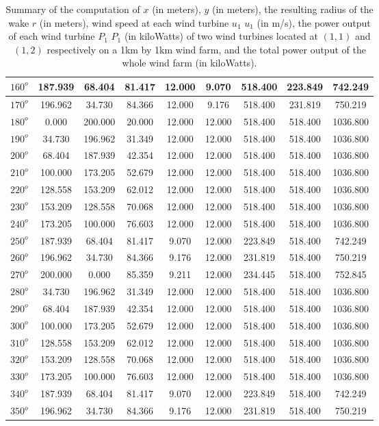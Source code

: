 \begin{table}[H]
\begin{tabular}{|c|c|c|c|c|c|c|c|c|}
$160^o$	&187.939	&68.404	&81.417	&12.000	&9.070	&518.400	&223.849	&742.249 \\ \hline
$170^o$	&196.962	&34.730	&84.366	&12.000	&9.176	&518.400	&231.819	&750.219 \\ \hline
$180^o$	&0.000	&200.000	&20.000	&12.000	&12.000	&518.400	&518.400	&1036.800 \\ \hline
$190^o$	&34.730	&196.962	&31.349	&12.000	&12.000	&518.400	&518.400	&1036.800 \\ \hline
$200^o$	&68.404	&187.939	&42.354	&12.000	&12.000	&518.400	&518.400	&1036.800 \\ \hline
$210^o$	&100.000	&173.205	&52.679	&12.000	&12.000	&518.400	&518.400	&1036.800 \\ \hline
$220^o$	&128.558	&153.209	&62.012	&12.000	&12.000	&518.400	&518.400	&1036.800 \\ \hline
$230^o$	&153.209	&128.558	&70.068	&12.000	&12.000	&518.400	&518.400	&1036.800 \\ \hline
$240^o$	&173.205	&100.000	&76.603	&12.000	&12.000	&518.400	&518.400	&1036.800 \\ \hline
$250^o$	&187.939	&68.404	&81.417	&9.070	&12.000	&223.849	&518.400	&742.249 \\ \hline
$260^o$	&196.962	&34.730	&84.366	&9.176	&12.000	&231.819	&518.400	&750.219 \\ \hline
$270^o$	&200.000	&0.000	&85.359	&9.211	&12.000	&234.445	&518.400	&752.845 \\ \hline
$280^o$	&34.730	&196.962	&31.349	&12.000	&12.000	&518.400	&518.400	&1036.800 \\ \hline
$290^o$	&68.404	&187.939	&42.354	&12.000	&12.000	&518.400	&518.400	&1036.800 \\ \hline
$300^o$	&100.000	&173.205	&52.679	&12.000	&12.000	&518.400	&518.400	&1036.800 \\ \hline
$310^o$	&128.558	&153.209	&62.012	&12.000	&12.000	&518.400	&518.400	&1036.800 \\ \hline
$320^o$	&153.209	&128.558	&70.068	&12.000	&12.000	&518.400	&518.400	&1036.800 \\ \hline
$330^o$	&173.205	&100.000	&76.603	&12.000	&12.000	&518.400	&518.400	&1036.800 \\ \hline
$340^o$	&187.939	&68.404	&81.417	&9.070	&12.000	&223.849	&518.400	&742.249 \\ \hline
$350^o$	&196.962	&34.730	&84.366	&9.176	&12.000	&231.819	&518.400	&750.219 \\ \hline
        \end{tabular}
        \caption{Summary of the computation of $x$ (in meters), $y$ (in meters), the resulting radius of the wake $r$ (in meters), wind speed at each wind turbine $u_1$ $u_1$ (in m/s), the power output of each wind turbine $P_1$ $P_1$ (in kiloWatts) of two wind turbines located at $(1,1)$ and $(1,2)$ respectively on a 1km by 1km wind farm, and the total power output of the whole wind farm (in kiloWatts).}
        \label{summaryWorst2}
    \end{table}
    \doublespacing
    
